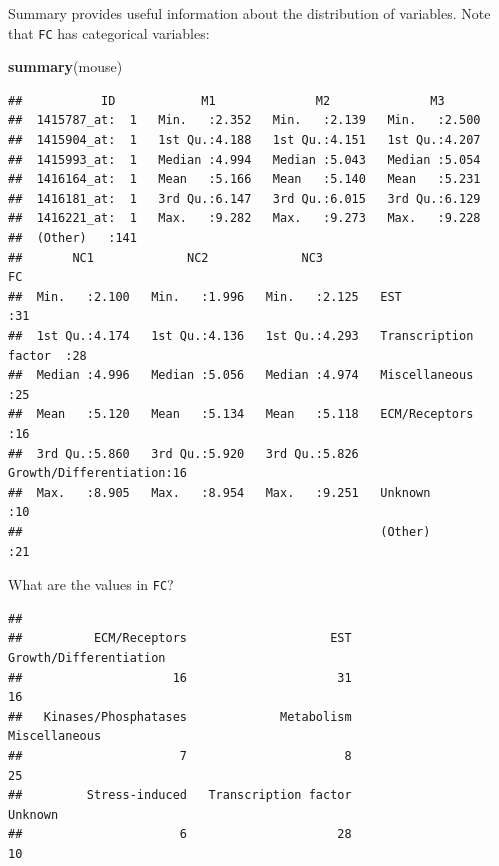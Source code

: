 \documentclass[
]{book}
\newenvironment{Shaded}{\begin{snugshade}}{\end{snugshade}}
\newcommand{\FunctionTok}[1]{\textcolor[rgb]{0.13,0.29,0.53}{\textbf{#1}}}
\newcommand{\NormalTok}[1]{#1}
\newcommand{\SpecialCharTok}[1]{\textcolor[rgb]{0.81,0.36,0.00}{\textbf{#1}}}
\begin{document}
Summary provides useful information about the distribution of variables. Note that \texttt{FC} has categorical variables:

\begin{Shaded}
\begin{Highlighting}[]
\FunctionTok{summary}\NormalTok{(mouse)}
\end{Highlighting}
\end{Shaded}

\begin{verbatim}
##           ID            M1              M2              M3       
##  1415787_at:  1   Min.   :2.352   Min.   :2.139   Min.   :2.500  
##  1415904_at:  1   1st Qu.:4.188   1st Qu.:4.151   1st Qu.:4.207  
##  1415993_at:  1   Median :4.994   Median :5.043   Median :5.054  
##  1416164_at:  1   Mean   :5.166   Mean   :5.140   Mean   :5.231  
##  1416181_at:  1   3rd Qu.:6.147   3rd Qu.:6.015   3rd Qu.:6.129  
##  1416221_at:  1   Max.   :9.282   Max.   :9.273   Max.   :9.228  
##  (Other)   :141                                                  
##       NC1             NC2             NC3                             FC    
##  Min.   :2.100   Min.   :1.996   Min.   :2.125   EST                   :31  
##  1st Qu.:4.174   1st Qu.:4.136   1st Qu.:4.293   Transcription factor  :28  
##  Median :4.996   Median :5.056   Median :4.974   Miscellaneous         :25  
##  Mean   :5.120   Mean   :5.134   Mean   :5.118   ECM/Receptors         :16  
##  3rd Qu.:5.860   3rd Qu.:5.920   3rd Qu.:5.826   Growth/Differentiation:16  
##  Max.   :8.905   Max.   :8.954   Max.   :9.251   Unknown               :10  
##                                                  (Other)               :21
\end{verbatim}

What are the values in \texttt{FC}?

\begin{Shaded}
\end{Shaded}

\begin{verbatim}
## 
##          ECM/Receptors                    EST Growth/Differentiation 
##                     16                     31                     16 
##   Kinases/Phosphatases             Metabolism          Miscellaneous 
##                      7                      8                     25 
##         Stress-induced   Transcription factor                Unknown 
##                      6                     28                     10
\end{verbatim}
\end{document}
